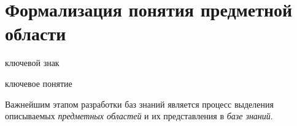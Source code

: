 \section{Формализация понятия предметной области}
\label{sec_sd}

\begin{SCn}
	\begin{scnrelfromlist}{ключевой знак}
	\end{scnrelfromlist}
\end{SCn}

\begin{SCn}
	\begin{scnrelfromlist}{ключевое понятие}
	\end{scnrelfromlist}
\end{SCn}

Важнейшим этапом разработки баз знаний является процесс выделения описываемых \textit{предметных областей} и их представления в \textit{базе знаний}.

